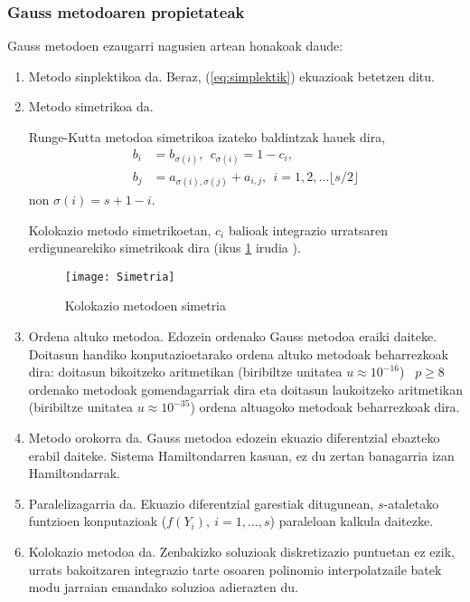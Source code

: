 \subsubsection*{Gauss metodoaren propietateak}

Gauss metodoen ezaugarri nagusien artean honakoak daude:  
\begin{enumerate}
\item Metodo sinplektikoa da. Beraz, (\ref{eq:simplektik}) ekuazioak betetzen ditu. 
 
\item{Metodo simetrikoa da.}

Runge-Kutta metodoa simetrikoa izateko baldintzak hauek dira,
\begin{align*}
\label {eq:2}
 b_{i} &= b_{\sigma(i)} ,\ \  c_{\sigma(i)}= 1-c_{i}, \\
 b_{j} &= a_{\sigma(i),\sigma(j)}+a_{i,j}, \ \  i=1,2,\dots \lfloor s/2\rfloor
 \end{align*} 
non $\sigma(i)=s+1-i$.

Kolokazio metodo simetrikoetan, $c_i$ balioak integrazio urratsaren erdigunearekiko simetrikoak dira (ikus \ref{fig:simetrikoa} irudia  ).  
 \begin{figure}[h]
 \centering
 \texttt{[image: Simetria]}
 \caption[Kolokazio metodoen simetria]{ \small Kolokazio metodoen simetria}
 \label{fig:simetrikoa}
 \end{figure}
 
\item{Ordena altuko metodoa.}
Edozein ordenako Gauss metodoa eraiki daiteke. Doitasun handiko konputazioetarako ordena altuko metodoak beharrezkoak dira: doitasun bikoitzeko aritmetikan (biribiltze unitatea $u\approx10^{-16}$) ~$p\geqslant8$ ordenako metodoak gomendagarriak dira eta doitasun laukoitzeko aritmetikan (biribiltze unitatea $u\approx10^{-35}$) ordena altuagoko metodoak beharrezkoak dira.  

\item{Metodo orokorra da.}
Gauss metodoa edozein ekuazio diferentzial ebazteko erabil daiteke. Sistema Hamiltondarren kasuan, ez du zertan banagarria izan  Hamiltondarrak.

\item{Paralelizagarria da.}
Ekuazio diferentzial garestiak ditugunean, $s$-ataletako funtzioen konputazioak ($f(Y_i), \ i=1,\dots,s$) paraleloan kalkula daitezke.  

\item{Kolokazio metodoa da.}
Zenbakizko soluzioak diskretizazio puntuetan ez ezik, urrats bakoitzaren integrazio tarte osoaren polinomio interpolatzaile batek modu jarraian emandako soluzioa adierazten du.


\end{enumerate}
